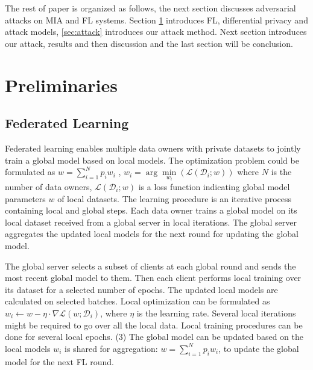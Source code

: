 The rest of paper is organized as follows, the next section discusses adversarial attacks on MIA and FL systems. Section \ref{sec:prelimianries} introduces FL, differential privacy and attack models,  \ref{sec:attack} introduces our attack method. Next section introduces our attack, results and then discussion and the last section will be conclusion.

\section{Preliminaries}
\label{sec:prelimianries}
\subsection{Federated Learning}



Federated learning enables multiple data owners with private datasets to jointly train a global model based on local models. The  optimization problem could be formulated as
${w} = \sum\limits_{i=1}^{N}{p_{i}{w}_{i}}$ , ${w}_{i}=\arg\min\limits_{{w}_{i}}{\left(\mathcal{L}(\mathcal{D}_{i};{w})\right)}$ where $N$ is the number of data owners, $\mathcal{L}(\mathcal{D}_{i};{w})$ is a loss function indicating global model parameters  ${w}$ of local datasets.  
 The learning procedure is an iterative process containing local and global steps. Each data owner trains a global model on its local dataset received from a global server in local iterations. The global server aggregates the updated local models for the next round for updating the global model. 
 
 The global server selects a subset of clients at each global round and sends the most recent global model to them. Then each client performs local training over its dataset for a selected number of epochs. The updated local models are calculated on selected batches. Local optimization can be formulated as ${w}_i \leftarrow {w}-\eta\cdot \nabla \mathcal{L}({w};\mathcal{D}_{i})$, where 
 $\eta$ is the learning rate. Several local iterations might be required to go over all the local data. Local training procedures can be done for several local epochs.
%
(3) The global model can be updated based on the local models ${w}_i$ is shared for aggregation: 
${w} = \sum\limits_{i=1}^{N}{p_{i}{w}_{i}}$, to update the global model for the next FL round.

